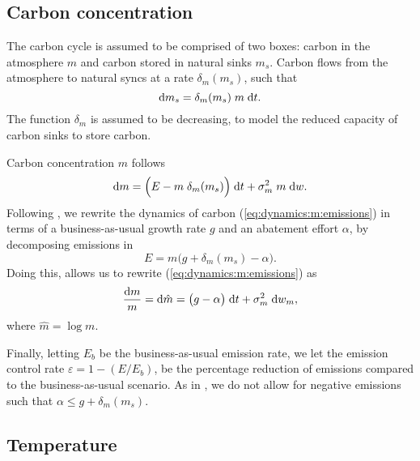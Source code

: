 \documentclass[../../main.tex]{subfiles}
\begin{document}
\subsection{Carbon concentration}

The carbon cycle is assumed to be comprised of two boxes: carbon in the atmosphere $m$ and carbon stored in natural sinks $m_s$. Carbon flows from the atmosphere to natural syncs at a rate $\delta_m(m_s)$, such that \begin{equation} \label{eq:dynamics:sink}
    \text{d} m_s = \delta_m(m_s) \; m \; \text{d} t.
\end{equation} The function $\delta_m$ is assumed to be decreasing, to model the reduced capacity of carbon sinks to store carbon.

Carbon concentration $m$ follows \begin{equation} \label{eq:dynamics:m:emissions}
    \text{d}{m} = \Big(E - m \; \delta_m(m_s)\Big) \; \text{d}{t} + \sigma^2_m \; m \; \text{d}{w}.
\end{equation}  Following , we rewrite the dynamics of carbon (\ref{eq:dynamics:m:emissions}) in terms of a business-as-usual growth rate $g$ and an abatement effort $\alpha$, by decomposing emissions in \begin{equation}
    E = m \Big( g + \delta_m(m_s) - \alpha \Big).
\end{equation} Doing this, allows us to rewrite (\ref{eq:dynamics:m:emissions}) as \begin{equation}\label{eq:dynamics:m:abatement}
    \frac{\text{d}{m}}{m} = \text{d}{\hat m} = \big(g - \alpha \big) \; \text{d}{t} + \sigma^2_m \; \text{d} w_m,
\end{equation} where $\hat m = \log m$.

Finally, letting $E_b$ be the business-as-usual emission rate, we let the emission control rate $\varepsilon = 1 - (E / E_b)$, be the percentage reduction of emissions compared to the business-as-usual scenario. As in , we do not allow for negative emissions such that $\alpha \leq g + \delta_m(m_s)$.

\subsection{Temperature}
\end{document}
